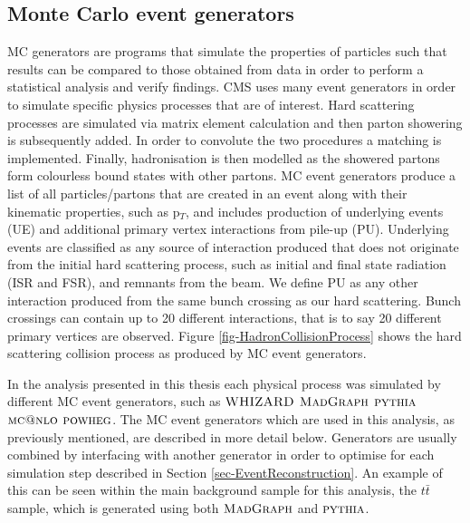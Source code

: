 \subsection{Monte Carlo event generators} \label{subsec-MCEventGenerators}

MC generators are programs that simulate the properties of particles such that results can be compared to those obtained from data in order to perform a statistical analysis and verify findings. CMS uses many event generators in order to simulate specific physics processes that are of interest. Hard scattering processes are simulated via matrix element calculation and then parton showering is subsequently added. In order to convolute the two procedures a matching is implemented. Finally, hadronisation is then modelled as the showered partons form colourless bound states with other partons. MC event generators produce a list of all particles/partons that are created in an event along with their kinematic properties, such as p$_T$, and includes production of underlying events (UE) and additional primary vertex interactions from pile-up (PU). Underlying events are classified as any source of interaction produced that does not originate from the initial hard scattering process, such as initial and final state radiation (ISR and FSR), and remnants from the beam. We define PU as any other interaction produced from the same bunch crossing as our hard scattering. Bunch crossings can contain up to 20 different interactions, that is to say 20 different primary vertices are observed. Figure \ref{fig-HadronCollisionProcess} shows the hard scattering collision process as produced by MC event generators. 

In the analysis presented in this thesis each physical process was simulated by different MC event generators, such as ${\textsc{WHIZARD}}$ $\textsc{MadGraph}$ ${\textsc{pythia}}$ $\textsc{mc@nlo}$ ${\textsc{powheg}}$. The MC event generators which are used in this analysis, as previously mentioned, are described in more detail below. Generators are usually combined by interfacing with another generator in order to optimise for each simulation step described in Section \ref{sec-EventReconstruction}. An example of this can be seen within the main background sample for this analysis, the $t\bar{t}$ sample, which is generated using both $\textsc{MadGraph}$ and ${\textsc{pythia}}$.   

